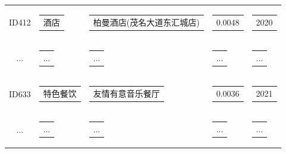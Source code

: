 \documentclass[bwprint]{gmcmthesis}
\begin{document}
\begin{center}
\begin{longtable}{c|c|c|c|c}
          ID412 & \begin{tabular}[c]{@{}c@{}}
            酒店
            \end{tabular} 
            & \begin{tabular}[c]{@{}l@{}}
              柏曼酒店(茂名大道东汇城店)
            \end{tabular} 
            & \begin{tabular}[c]{@{}c@{}}
              0.0048
              \end{tabular}
              & \begin{tabular}[c]{@{}c@{}}
                2020
                \end{tabular}\\
            ... & \begin{tabular}[c]{@{}c@{}}
              ...
            \end{tabular} 
            & \begin{tabular}[c]{@{}l@{}}
              ...
            \end{tabular} 
            & \begin{tabular}[c]{@{}c@{}}
              ...
            \end{tabular} 
            & \begin{tabular}[c]{@{}c@{}}
              ...
            \end{tabular} \\
            ID633 & \begin{tabular}[c]{@{}c@{}}
              特色餐饮
              \end{tabular} 
              & \begin{tabular}[c]{@{}l@{}}
                友情有意音乐餐厅
              \end{tabular} 
              & \begin{tabular}[c]{@{}c@{}}
                0.0036
                \end{tabular}
                & \begin{tabular}[c]{@{}c@{}}
                  2021
                  \end{tabular}\\
              ... & \begin{tabular}[c]{@{}c@{}}
                ...
              \end{tabular} 
              & \begin{tabular}[c]{@{}l@{}}
                ...
              \end{tabular} 
              & \begin{tabular}[c]{@{}c@{}}
                ...
              \end{tabular} 
              & \begin{tabular}[c]{@{}c@{}}
                ...
              \end{tabular} \\
      \hline
  \end{longtable}
  \end{center}
\end{document}
